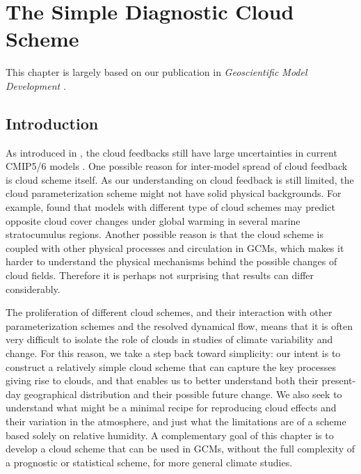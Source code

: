 \chapter{The Simple Diagnostic Cloud Scheme}
\label{ch:simple_cld_scheme}

This chapter is largely based on our publication in \textit{Geoscientific Model Development} \citep{Liu2021simcloud}.

\section{Introduction}

As introduced in , the cloud feedbacks still have large uncertainties in current CMIP5/6 models \citep{Zelinka2020causes}. One possible reason for inter-model spread of cloud feedback is cloud scheme itself. As our understanding on cloud feedback is still limited, the cloud parameterization scheme might not have solid physical backgrounds. For example, \cite{Qu2014} found that models with different type of cloud schemes may predict opposite cloud cover changes under global warming in several marine stratocumulus regions. Another possible reason is that the cloud scheme is coupled with other physical processes and circulation in GCMs, which makes it harder to understand the physical mechanisms behind the possible changes of cloud fields. Therefore it is perhaps not surprising that results can differ considerably.  

The proliferation of different cloud schemes, and their interaction with other parameterization schemes and the resolved dynamical flow, means that it is often very difficult to isolate the role of clouds in studies of climate variability and change. For this reason,  we take a step back toward simplicity: our intent is to construct a relatively simple cloud scheme that can capture the key processes giving rise to clouds, and that enables us to better understand both their present-day geographical distribution and their possible future change. We also seek to understand what might be a minimal recipe for reproducing cloud effects and their variation in the atmosphere, and just what the limitations are of a scheme based solely on relative humidity. A complementary goal of this chapter is to develop a cloud scheme that can be used in GCMs, without the full complexity of a prognostic or statistical scheme, for more general climate studies.

